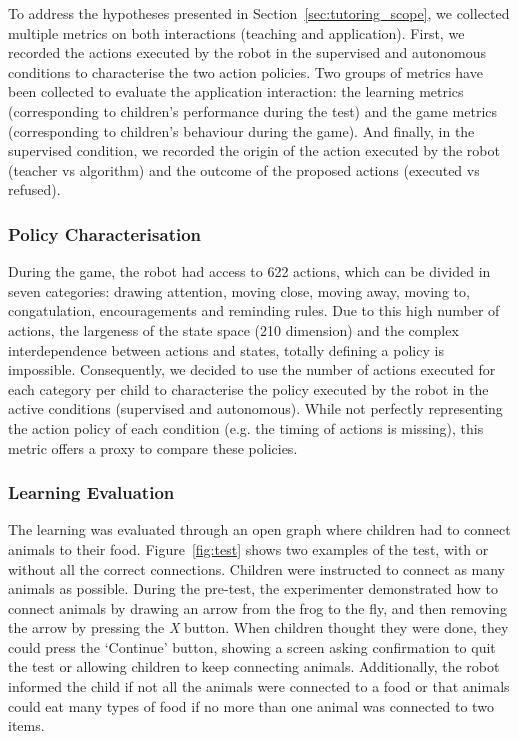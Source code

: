 To address the hypotheses presented in Section~\ref{sec:tutoring_scope}, we collected multiple metrics on both interactions (teaching and application). First, we recorded the actions executed by the robot in the supervised and autonomous conditions to characterise the two action policies. Two groups of metrics have been collected to evaluate the application interaction: the learning metrics (corresponding to children's performance during the test) and the game metrics (corresponding to children's behaviour during the game). And finally, in the supervised condition, we recorded the origin of the action executed by the robot (teacher vs algorithm) and the outcome of the proposed actions (executed vs refused).

\subsubsection{Policy Characterisation}

During the game, the robot had access to 622 actions, which can be divided in seven categories: drawing attention, moving close, moving away, moving to, congatulation, encouragements and reminding rules. Due to this high number of actions, the largeness of the state space (210 dimension) and the complex interdependence between actions and states, totally defining a policy is impossible. Consequently, we decided to use the number of actions executed for each category per child to characterise the policy executed by the robot in the active conditions (supervised and autonomous). While not perfectly representing the action policy of each condition (e.g. the timing of actions is missing), this metric offers a proxy to compare these policies. 

\subsubsection{Learning Evaluation}
The learning was evaluated through an open graph where children had to connect animals to their food. Figure~\ref{fig:test} shows two examples of the test, with or without all the correct connections. Children were instructed to connect as many animals as possible. During the pre-test, the experimenter demonstrated how to connect animals by drawing an arrow from the frog to the fly, and then removing the arrow by pressing the \textit{X} button. When children thought they were done, they could press the `Continue' button, showing a screen asking confirmation to quit the test or allowing children to keep connecting animals. Additionally, the robot informed the child if not all the animals were connected to a food or that animals could eat many types of food if no more than one animal was connected to two items. 

